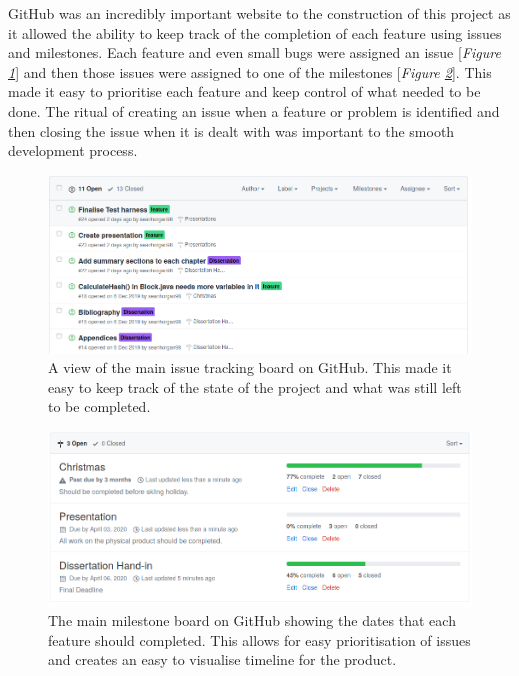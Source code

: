 \documentclass{l4proj}
\begin{document}
GitHub was an incredibly important website to the construction of this project as it allowed the ability to keep
track of the completion of each feature using issues and milestones. Each feature and even small bugs were assigned
an issue [\textit{Figure \ref{fig:issues}}] and then those issues were assigned to one of the milestones [\textit{Figure \ref{fig:milestones}}]. 
This made it easy to prioritise each feature and keep control of what needed to be done. The ritual of creating
an issue when a feature or problem is identified and then closing the issue when it is dealt with was important to 
the smooth development process.


\begin{figure}[!ht]
    \centering
    \includegraphics[width=1\linewidth]{images/issues.png}    

    \caption{
        A view of the main issue tracking board on GitHub. This made it easy to keep track of the state of the project
        and what was still left to be completed.
    }
    \label{fig:issues} 
\end{figure}
\vspace{10cm}

\begin{figure}[!ht]
    \centering
    \includegraphics[width=1\linewidth]{images/milestones.png}    

    \caption{
        The main milestone board on GitHub showing the dates that each feature should completed. This
        allows for easy prioritisation of issues and creates an easy to visualise timeline for the product.
    }
    \label{fig:milestones} 
\end{figure}
\end{document}
